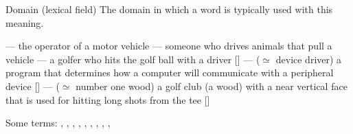 \documentclass{beamer}
\begin{document}
\begin{frame}{Domain (lexical field)}
The domain in which a word is typically used with this meaning.

\begin{exe}
  \ex {} --- the operator of a motor vehicle
  \ex {} --- someone who drives animals that pull a vehicle
  \ex {} --- a golfer who hits the golf ball with a driver [] 
  \ex {} --- ($\simeq$ device driver) a program that determines how a computer will communicate with a peripheral device [] 
  \ex {} --- ($\simeq$ number one wood) a golf club (a wood) with a near vertical face that is used for hitting long shots from the tee [] 
\end{exe}

Some  terms: , , , , , , , , , 


\end{frame}
\end{document}

